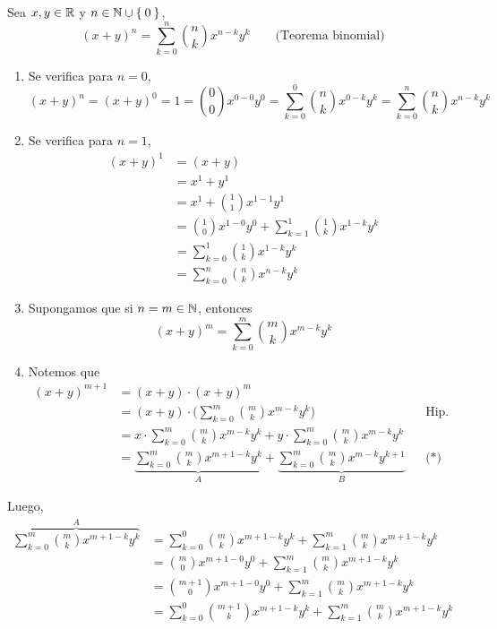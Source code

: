 Sea $x,y\in \mathbb{R}$ y $n\in \mathbb{N}\cup\Set{0}$,
\[(x+ y)^n = \sum_{k=0}^{n} \binom{n}{k} x^{n-k}y^k \qquad \text{(Teorema binomial)}\]

  \begin{enumerate}[label=\roman*)]
    \item Se verifica para $n=0$, \[(x+ y)^n = (x+ y)^0= 1= \binom{0}{0} x^{0-0}y^0= \sum_{k=0}^{0} \binom{n}{k} x^{0-k}y^k= \sum_{k=0}^{n} \binom{n}{k} x^{n-k}y^k\]
    \item Se verifica para $n=1$,
    \begin{align*}
      (x+ y)^1 &= (x+ y)\\
      &= x^1 + y^1\\
      &= x^1 + \binom{1}{1}x^{1-1}y^1\\
      &= \binom{1}{0} x^{1-0}y^0 + \sum_{k=1}^{1} \binom{1}{k} x^{1-k}y^k\\
      &= \sum_{k=0}^{1} \binom{1}{k} x^{1-k}y^k\\
      &= \sum_{k=0}^{n} \binom{n}{k} x^{n-k}y^k
    \end{align*}
    \item Supongamos que si $n=m\in \mathbb{N}$, entonces \[(x+ y)^m = \sum_{k=0}^{m} \binom{m}{k} x^{m-k}y^k\]
    \item Notemos que 
    \begin{align*}
      (x+ y)^{m+1} &= (x+y)\cdot (x + y)^m\\
      &= (x+y)\cdot \Bigg(\sum_{k=0}^{m} \binom{m}{k} x^{m-k}y^k\Bigg) && \text{Hip. Inducción}\\
      &= x \cdot \sum_{k=0}^{m} \binom{m}{k} x^{m-k}y^k + y \cdot \sum_{k=0}^{m} \binom{m}{k} x^{m-k}y^k \\
      &= \underbrace{\sum_{k=0}^{m} \binom{m}{k} x^{m+1-k}y^k}_{A} + \underbrace{\sum_{k=0}^{m} \binom{m}{k} x^{m-k}y^{k+1}}_{B} && \text{(*)}
      \end{align*}
  \end{enumerate}
Luego,
  \begin{align*}
    \overbrace{\sum_{k=0}^{m} \binom{m}{k} x^{m+1-k}y^k}^{A} &= \sum_{k=0}^{0} \binom{m}{k} x^{m+1-k}y^k +\sum_{k=1}^{m} \binom{m}{k} x^{m+1-k}y^k\\
    &= \binom{m}{0} x^{m+1-0}y^0 +\sum_{k=1}^{m} \binom{m}{k} x^{m+1-k}y^k\\
    &= \binom{m+1}{0} x^{m+1-0}y^0 +\sum_{k=1}^{m} \binom{m}{k} x^{m+1-k}y^k\\
    &= \sum_{k=0}^{0} \binom{m+1}{k} x^{m+1-k}y^k +\sum_{k=1}^{m} \binom{m}{k} x^{m+1-k}y^k
  \end{align*}
  
